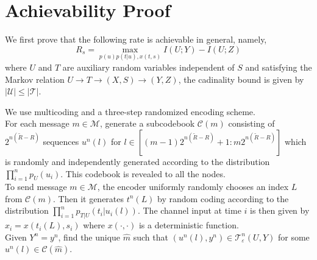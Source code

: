 \documentclass[12pt, Draft, onecolumn]{IEEEtran}
\def\calC{{\mathcal{C}}}
\def\calM{{\mathcal{M}}}
\def\calU{{\mathcal{U}}}
\def\calT{{\mathcal{T}}}
\begin{document}
\section{Achievability Proof}
We first prove that the following rate is achievable in general, namely,
\begin{equation}\label{eq.achievable}
R_s = \max_{p(u)p(t|u),x(t,s)} I(U;Y)-I(U;Z)
\end{equation}
where $U$ and $T$ are auxiliary random variables independent of $S$ and satisfying the Markov relation $U\rightarrow T\rightarrow (X,S)\rightarrow (Y,Z)$, the cadinality bound is given by $|\calU|\leq |\calT|$.

We use multicoding and a three-step randomized encoding scheme.\\

 For each message $m\in \calM$, generate a subcodebook $\calC(m)$ consisting of $2^{n(\tilde{R}-R)}$ sequences $u^n(l)$ for $l\in [(m-1)2^{n(\tilde{R}-R)}+1:m2^{n(\tilde{R}-R)}]$ which is randomly and independently generated according to the distribution $\prod_{i=1}^n p_U(u_i)$. This codebook is revealed to all the nodes.\\

 To send message $m\in\calM$, the encoder uniformly randomly chooses an index $L$ from $\calC(m)$. Then it generates $t^n(L)$ by random coding according to the distribution $\prod_{i=1}^n p_{T|U}(t_i|u_i(l))$. The channel input at time $i$ is then given by $x_i=x(t_i(L),s_i)$ where $x(\cdot,\cdot)$ is a deterministic function.\\

 Given $Y^n=y^n$, find the unique $\hat{m}$ such that $(u^n(l), y^n)\in\calT^n_{\varepsilon}(U,Y)$ for some $u^n(l)\in\calC(\hat{m})$.\\
\end{document}
